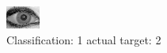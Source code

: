 \begin{figure}[h!]
\begin{center}
\includegraphics[width=0.60\columnwidth]{figures/ID1987_class_1_target_2.png}
\end{center}
\caption{ Classification: 1 actual target: 2}
\label{fig:ID1987_class_1_target_2}
\end{figure}
